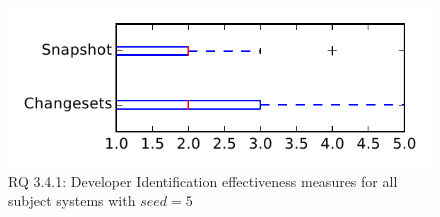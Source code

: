 
\begin{figure}
\centering
\includegraphics[height=0.4\textheight]{figures/dit_seed/rq1_tiny_5}
\caption{RQ 3.4.1: Developer Identification effectiveness measures for all subject systems with $seed=5$}
\label{fig:dit_seed:rq1:tiny}
\end{figure}
